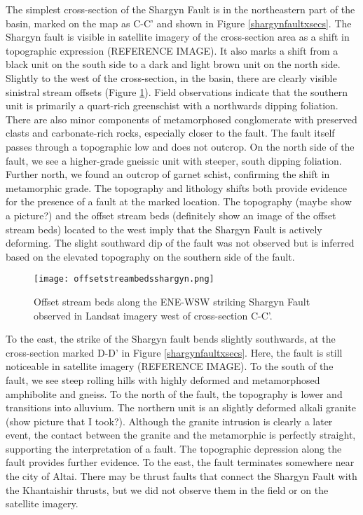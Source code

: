 \documentclass[10pt,a4paper]{article}
\begin{document}
The simplest cross-section of the Shargyn Fault is in the northeastern part of the basin, marked on the map as C-C' and shown in Figure \ref{shargynfaultxsecs}. The Shargyn fault is visible in satellite imagery of the cross-section area as a shift in topographic expression (REFERENCE IMAGE). It also marks a shift from a black unit on the south side to a dark and light brown unit on the north side. Slightly to the west of the cross-section, in the basin, there are clearly visible sinistral stream offsets (Figure \ref{shargynoffsetstreams}). Field observations indicate that the southern unit is primarily a quart-rich greenschist with a northwards dipping foliation. There are also minor components of metamorphosed conglomerate with preserved clasts and carbonate-rich rocks, especially closer to the fault.  The fault itself passes through a topographic low and does not outcrop. On the north side of the fault, we see a higher-grade gneissic unit with steeper, south dipping foliation. Further north, we found an outcrop of garnet schist, confirming the shift in metamorphic grade. The topography and lithology shifts both provide evidence for the presence of a fault at the marked location. The topography (maybe show a picture?) and the offset stream beds (definitely show an image of the offset stream beds) located to the west imply that the Shargyn Fault is actively deforming. The slight southward dip of the fault was not observed but is inferred based on the elevated topography on the southern side of the fault. 

\begin{figure}[h!]
  \centering
  \texttt{[image: offsetstreambedsshargyn.png]}
  \caption{Offset stream beds along the ENE-WSW striking Shargyn Fault observed in Landsat imagery west of cross-section C-C'.}
  \label{shargynoffsetstreams}
\end{figure}

To the east, the strike of the Shargyn fault bends slightly southwards, at the cross-section marked D-D' in Figure \ref{shargynfaultxsecs}. Here, the fault is still noticeable in satellite imagery (REFERENCE IMAGE). To the south of the fault, we see steep rolling hills with highly deformed and metamorphosed amphibolite and gneiss. To the north of the fault, the topography is lower and transitions into alluvium. The northern unit is an slightly deformed alkali granite (show picture that I took?). Although the granite intrusion is clearly a later event, the contact between the granite and the metamorphic is perfectly straight, supporting the interpretation of a fault. The topographic depression along the fault provides further evidence. To the east, the fault terminates somewhere near the city of Altai. There may be thrust faults that connect the Shargyn Fault with the Khantaishir thrusts, but we did not observe them in the field or on the satellite imagery. 
\end{document}
